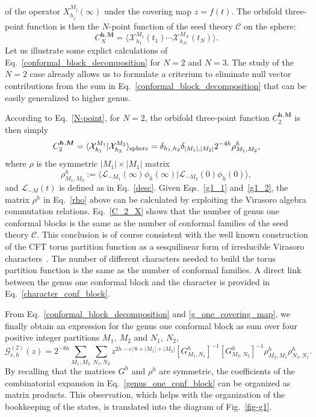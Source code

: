 \documentclass[a4paper,11pt]{article}
\begin{document}
of the operator $X_{h_j}^{M_j}(\infty)$ under the covering map $z=f(t)$. The  orbifold  three-point 
function  is then the $N$-point function of the seed theory $\mathcal{C}$ on the sphere:
\begin{equation}\label{N-point}
 C_N^{\boldsymbol{h},\boldsymbol{M}}=\langle \mathcal{X}^{M_1}_{h_1}(t_1)\cdots\mathcal{X}_{h_N}^{M_N}(t_N)\rangle.
\end{equation}
\noindent Let us illustrate some explict calculations of Eq.~\eqref{conformal_block_decomposition} for $N=2$ and $N=3$. The study of the $N=2$ case already allows us to formulate a criterium to eliminate null vector contributions from the sum in Eq.~\eqref{conformal_block_decomposition} that can be easily generalized to  higher genus.


According to Eq.~\eqref{N-point}, for $N=2$, the orbifold three-point function
$C_2^{\boldsymbol{h},\boldsymbol{M}}$ is then simply
\begin{equation}\label{C_2_X}
 C_2^{\boldsymbol{h},\boldsymbol{M}}=\langle \mathcal{X}_{h_1}^{M_1} | \mathcal{X}_{h_2}^{M_2}\rangle_{\rm{sphere}}=
 \delta_{h_1, h_2}\delta_{|M_1|,|M_2|}2^{-4h}\rho^h_{M_1,M_2},
\end{equation}
where $\rho$ is the symmetric $|M_1|\times|M_1|$ matrix
\begin{equation}
\label{rho}
 \rho^h_{M_1,M_2}:=\langle\boldsymbol{\mathcal{L}}_{-M_1}(\infty)\phi_{h}(\infty)|\boldsymbol{\mathcal{L}}_{-M_2}(0)\phi_{h}(0)\rangle,
\end{equation}
and $\boldsymbol{\mathcal{L}}_{-M}(t)$ is defined as in Eq.~\eqref{desc}. Given Eqs.~\eqref{g1_1} and~\eqref{g1_2}, the matrix $\rho^h$  in Eq.~\eqref{rho} above can be calculated by exploiting the Virasoro algebra commutation relations.
Eq.~\eqref{C_2_X} shows that the number of genus one conformal blocks is
the same as the number of conformal families of the seed theory $\mathcal{C}$.
This conclusion is of course consistent with the well known construction of the CFT torus partition function as a sesquilinear form of irreducible Virasoro characters~\cite{Cappelli, Cappelli2}. The number of different characters needed to build the torus partition function  is  the same as the number of conformal families. A direct link between the genus one conformal block and the character is provided in Eq.~\eqref{character_conf_block}.

From Eq.~\eqref{conformal_block_decomposition} and \eqref{g_one_covering_map}, we finally obtain 
an expression for the genus one conformal block as sum over four positive integer partitions $M_1,~M_2$ and $N_1,~N_2$,
\begin{equation}\label{genus_one_conf_block}
 \mathcal{G}_{c, h}^{(2)}(z)=2^{-8h}\sum_{M_1, M_2}\sum_{N_1, N_2}
 z^{2h-c/8+|M_1|+|M_2|}[G^{h}_{M_1,N_1}]^{-1}[G^{h}_{ M_2,N_2}]^{-1}
 \rho^h_{M_2,M_1}\rho^h_{N_2,N_1}.
\end{equation}
By recalling that the matrices $G^h$ and $\rho^h$ are symmetric, the coefficients of the combinatorial 
expansion in Eq.~\eqref{genus_one_conf_block} can be organized as 
matrix products. This observation, which helps with the organization of the bookkeeping of the states, is translated  into  the diagram of Fig.~\ref{fig-g1}. 
\end{document}
